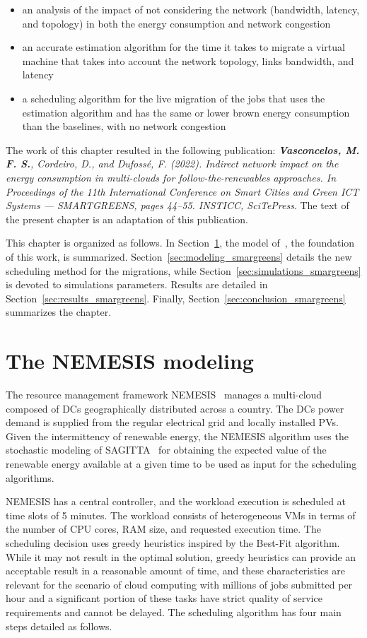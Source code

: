 \begin{itemize}
    \item an analysis of the impact of not considering the network (bandwidth, latency, and topology) in both the energy consumption and network congestion
    \item an accurate estimation algorithm for the time it takes to migrate a virtual machine that takes into account the network topology, links bandwidth, and latency
    \item a scheduling algorithm for the live migration of the jobs that uses the estimation algorithm and has the same or lower brown energy consumption than the baselines, with no network congestion
\end{itemize}


The work of this chapter resulted in the following publication:  \textit{\textbf{Vasconcelos, M. F. S.}, Cordeiro, D., and Dufossé, F. (2022). Indirect network impact on the energy consumption in multi-clouds for follow-the-renewables approaches. In Proceedings of the 11th International Conference on Smart Cities and Green ICT Systems — SMARTGREENS, pages 44–55. INSTICC, SciTePress}. The text of the present chapter is an adaptation of this publication.

This chapter is organized as follows. In Section~\ref{sec:nemesis}, the model of~\citet{NEMESIS}, the foundation of this work, is summarized. Section~\ref{sec:modeling_smargreens} details the new scheduling method for the migrations, while Section~\ref{sec:simulations_smargreens} is devoted to simulations parameters. Results are detailed in Section~\ref{sec:results_smargreens}. Finally, Section~\ref{sec:conclusion_smargreens} summarizes the chapter.


\section{The NEMESIS modeling}
\label{sec:nemesis}

The resource management framework NEMESIS~\cite{NEMESIS} manages a multi-cloud composed of DCs geographically distributed across a country. The DCs power demand is supplied from the regular electrical grid and locally installed PVs. Given the intermittency of renewable energy, the NEMESIS algorithm uses the stochastic modeling of SAGITTA~\cite{SAGITTA} for obtaining the expected value of the renewable energy available at a given time to be used as input for the scheduling algorithms.

NEMESIS has a central controller, and the workload execution is scheduled at time slots of 5 minutes. The workload consists of heterogeneous VMs in terms of the number of CPU cores, RAM size, and requested execution time. The scheduling decision uses greedy heuristics inspired by the Best-Fit algorithm. While it may not result in the optimal solution, greedy heuristics can provide an acceptable result in a reasonable amount of time, and these characteristics are relevant for the scenario of cloud computing with millions of jobs submitted per hour and a significant portion of these tasks have strict quality of service requirements and cannot be delayed. The scheduling algorithm has four main steps detailed as follows. 

